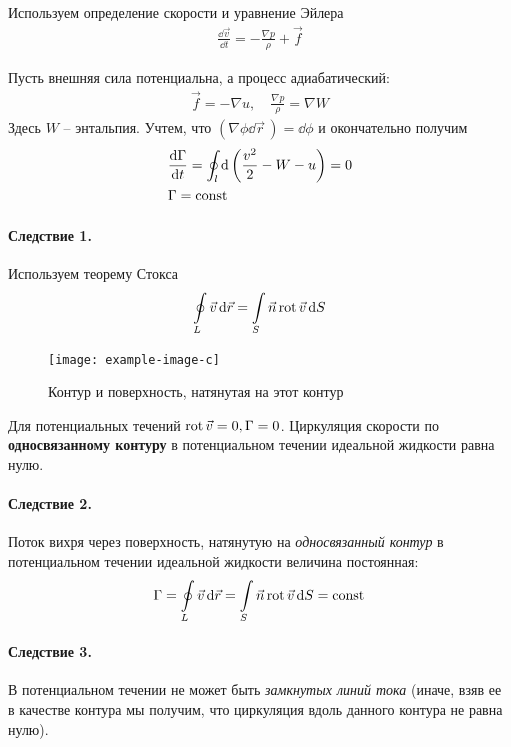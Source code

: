 Используем определение скорости и уравнение Эйлера
\begin{align*}
\frac { \dd \vec{v}  } { \dd t } = - \frac { \nabla p } { \rho } + \vec { f }
\end{align*}

Пусть внешняя сила потенциальна, а процесс адиабатический:
\begin{align*}
{ \vec { f } = - \nabla u }, \quad
{ \frac { \nabla p } { \rho } = \nabla W }
\end{align*}
Здесь $W$ -- энтальпия.  Учтем, что $ ( \nabla \phi \dd{\vec{r}}\, ) = \dd \phi $ и окончательно получим
\begin{align*}
&\frac { \dd \Gamma } { \dd t } = \oint _ { l } \dd \left( \frac { v ^ { 2 } } { 2 } - W - u \right) = 0 \\
& \Gamma = \mathrm{const}\,
\end{align*}

\paragraph{Следствие 1.} Используем теорему Стокса
\begin{align*}
\oint \limits_ { L } \vec{v} \dd{\vec{r}} = \int \limits_ { S } \vec { n }\operatorname{rot}\vec{v}\dd{S}
\end{align*}
\begin{figure}[h]
	\centering
	\texttt{[image: example-image-c]}
	\caption{Контур и поверхность, натянутая на этот контур}
	\label{fig:figure14}
\end{figure}

Для потенциальных течений $ \operatorname{rot} \vec{v} = 0 , \Gamma = 0$. Циркуляция скорости по \textbf{односвязанному контуру} в потенциальном течении идеальной жидкости равна нулю.

\paragraph{Следствие 2.} 	Поток вихря через поверхность, натянутую на  \textit{односвязанный контур} в потенциальном течении идеальной жидкости величина постоянная:
	\begin{align*}
	\Gamma = \oint \limits_ { L } \vec{v} \dd{\vec{r}} = \int \limits_ { S } \vec { n }  \operatorname{rot} \vec{v}\dd{S} = \mathrm{const}\,
	\end{align*}


\paragraph{Следствие 3.} 
В потенциальном течении не может быть \textit{замкнутых линий тока} (иначе, взяв ее в качестве контура мы получим, что циркуляция вдоль данного контура не равна нулю).

